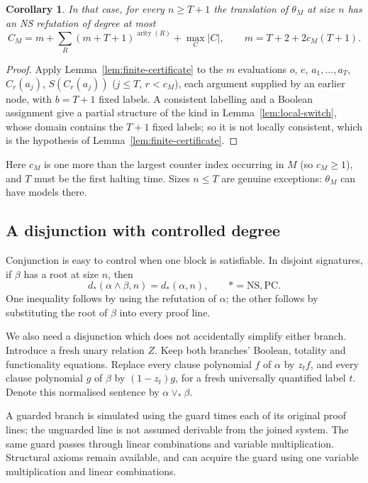 \documentclass[11pt,a4paper]{article}
\newtheorem{corollary}[theorem]{Corollary}
\theoremstyle{definition}\newtheorem{definition}[theorem]{Definition}
\theoremstyle{remark}\newtheorem{remark}[theorem]{Remark}
\newcommand{\NS}{\mathrm{NS}}\newcommand{\PC}{\mathrm{PC}}
\newcommand{\join}{\mathbin{\vee_*}}
\begin{document}
\begin{corollary}\label{cor:switch-degree}
In that case, for every $n\ge T+1$ the translation of $\theta_M$ at size $n$ has an NS refutation
of degree at most
\[
 C_M=m+\sum_R(m+T+1)^{\operatorname{arity}(R)}+\max_{C}|C|,\qquad m=T+2+2c_M(T+1).
\]
\end{corollary}
\begin{proof}
Apply Lemma~\ref{lem:finite-certificate} to the $m$ evaluations $o$, $e$, $a_1,\ldots,a_T$,
$C_r(a_j)$, $S(C_r(a_j))$ ($j\le T$, $r<c_M$), each argument supplied by an earlier node, with
$b=T+1$ fixed labels. A consistent labelling and a Boolean assignment give a partial structure of
the kind in Lemma~\ref{lem:local-switch}, whose domain contains the $T+1$ fixed labels; so it is not
locally consistent, which is the hypothesis of Lemma~\ref{lem:finite-certificate}.
\end{proof}

Here $c_M$ is one more than the largest counter index occurring in $M$ (so $c_M\ge1$), and $T$ must be
the first halting time. Sizes $n\le T$ are genuine exceptions: $\theta_M$ can have models there.

\subsection{A disjunction with controlled degree}
Conjunction is easy to control when one block is satisfiable. In disjoint
signatures, if $\beta$ has a root at size $n$, then
\begin{equation}\label{eq:satisfiable-block}
 d_*(\alpha\wedge\beta,n)=d_*(\alpha,n),
 \qquad *=\NS,\PC.
\end{equation}
One inequality follows by using the refutation of $\alpha$; the other
follows by substituting the root of $\beta$ into every proof line.

We also need a disjunction which does not accidentally simplify either
branch. Introduce a fresh unary relation $Z$. Keep both branches' Boolean,
totality and functionality equations. Replace every clause polynomial $f$
of $\alpha$ by $z_t f$, and every clause polynomial $g$ of $\beta$ by
$(1-z_t)g$, for a fresh universally quantified label $t$. Denote this
normalised sentence by $\alpha\join\beta$.

A guarded branch is simulated using the guard times each of its
original proof lines; the unguarded line is not assumed derivable
from the joined system. The same guard passes through linear
combinations and variable multiplication. Structural axioms remain
available, and can acquire the guard using one variable multiplication
and linear combinations.
\end{document}
